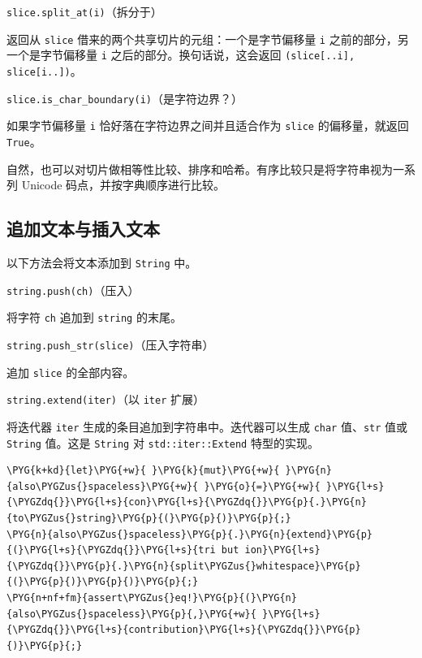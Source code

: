 \begin{mySidenote}
\texttt{slice.split\_at(i)}（拆分于）
\end{mySidenote}

返回从 \texttt{slice} 借来的两个共享切片的元组：一个是字节偏移量 \texttt{i} 之前的部分，另一个是字节偏移量 \texttt{i} 之后的部分。换句话说，这会返回 \texttt{(slice[..i], slice[i..])}。

\begin{myNote}
\texttt{slice.is\_char\_boundary(i)}（是字符边界？）
\end{myNote}

如果字节偏移量 \texttt{i} 恰好落在字符边界之间并且适合作为 \texttt{slice} 的偏移量，就返回 \texttt{True}。

自然，也可以对切片做相等性比较、排序和哈希。有序比较只是将字符串视为一系列 Unicode 码点，并按字典顺序进行比较。

\subsection{追加文本与插入文本}

以下方法会将文本添加到 \texttt{String} 中。

\begin{mySidenote}
\texttt{string.push(ch)}（压入）
\end{mySidenote}

将字符 \texttt{ch} 追加到 \texttt{string} 的末尾。

\begin{myNote}
\texttt{string.push\_str(slice)}（压入字符串）
\end{myNote}

追加 \texttt{slice} 的全部内容。

\begin{myNote}
\texttt{string.extend(iter)}（以 \texttt{iter} 扩展）
\end{myNote}

将迭代器 \texttt{iter} 生成的条目追加到字符串中。迭代器可以生成 \texttt{char} 值、\texttt{str} 值或 \texttt{String} 值。这是 \texttt{String} 对 \texttt{std::iter::Extend} 特型的实现。

\begin{Verbatim}[commandchars=\\\{\},breaklines=true,breakanywhere=true,fontsize=\codefont,xleftmargin=17bp]
\PYG{k+kd}{let}\PYG{+w}{ }\PYG{k}{mut}\PYG{+w}{ }\PYG{n}{also\PYGZus{}spaceless}\PYG{+w}{ }\PYG{o}{=}\PYG{+w}{ }\PYG{l+s}{\PYGZdq{}}\PYG{l+s}{con}\PYG{l+s}{\PYGZdq{}}\PYG{p}{.}\PYG{n}{to\PYGZus{}string}\PYG{p}{(}\PYG{p}{)}\PYG{p}{;}
\PYG{n}{also\PYGZus{}spaceless}\PYG{p}{.}\PYG{n}{extend}\PYG{p}{(}\PYG{l+s}{\PYGZdq{}}\PYG{l+s}{tri but ion}\PYG{l+s}{\PYGZdq{}}\PYG{p}{.}\PYG{n}{split\PYGZus{}whitespace}\PYG{p}{(}\PYG{p}{)}\PYG{p}{)}\PYG{p}{;}
\PYG{n+nf+fm}{assert\PYGZus{}eq!}\PYG{p}{(}\PYG{n}{also\PYGZus{}spaceless}\PYG{p}{,}\PYG{+w}{ }\PYG{l+s}{\PYGZdq{}}\PYG{l+s}{contribution}\PYG{l+s}{\PYGZdq{}}\PYG{p}{)}\PYG{p}{;}
\end{Verbatim}

